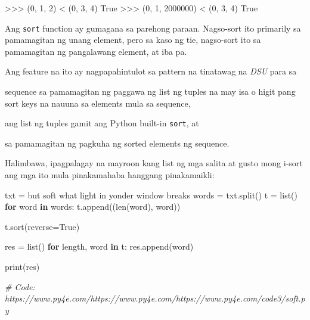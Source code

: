 \documentclass[10pt,]{book}
\newenvironment{Shaded}{}{}
\newcommand{\BuiltInTok}[1]{\textcolor[rgb]{0.00,0.50,0.00}{#1}}
\newcommand{\CommentTok}[1]{\textcolor[rgb]{0.38,0.63,0.69}{\textit{#1}}}
\newcommand{\ControlFlowTok}[1]{\textcolor[rgb]{0.00,0.44,0.13}{\textbf{#1}}}
\newcommand{\DecValTok}[1]{\textcolor[rgb]{0.25,0.63,0.44}{#1}}
\newcommand{\KeywordTok}[1]{\textcolor[rgb]{0.00,0.44,0.13}{\textbf{#1}}}
\newcommand{\NormalTok}[1]{#1}
\newcommand{\OperatorTok}[1]{\textcolor[rgb]{0.40,0.40,0.40}{#1}}
\newcommand{\StringTok}[1]{\textcolor[rgb]{0.25,0.44,0.63}{#1}}
\newcommand{\VariableTok}[1]{\textcolor[rgb]{0.10,0.09,0.49}{#1}}
\providecommand{\tightlist}{%
  \setlength{\itemsep}{0pt}\setlength{\parskip}{0pt}}
\begin{document}
\begin{Shaded}
\begin{Highlighting}[]
\OperatorTok{\textgreater{}\textgreater{}\textgreater{}}\NormalTok{ (}\DecValTok{0}\NormalTok{, }\DecValTok{1}\NormalTok{, }\DecValTok{2}\NormalTok{) }\OperatorTok{\textless{}}\NormalTok{ (}\DecValTok{0}\NormalTok{, }\DecValTok{3}\NormalTok{, }\DecValTok{4}\NormalTok{)}
\VariableTok{True}
\OperatorTok{\textgreater{}\textgreater{}\textgreater{}}\NormalTok{ (}\DecValTok{0}\NormalTok{, }\DecValTok{1}\NormalTok{, }\DecValTok{2000000}\NormalTok{) }\OperatorTok{\textless{}}\NormalTok{ (}\DecValTok{0}\NormalTok{, }\DecValTok{3}\NormalTok{, }\DecValTok{4}\NormalTok{)}
\VariableTok{True}
\end{Highlighting}
\end{Shaded}

Ang \texttt{sort} function ay gumagana sa parehong paraan. Nagso-sort
ito primarily sa pamamagitan ng unang element, pero sa kaso ng tie,
nagso-sort ito sa pamamagitan ng pangalawang element, at iba pa.

Ang feature na ito ay nagpapahintulot sa pattern na tinatawag na
\emph{DSU} para sa

\begin{description}
\tightlist
\item[Decorate]
sequence sa pamamagitan ng paggawa ng list ng tuples na may isa o higit
pang sort keys na nauuna sa elements mula sa sequence,
\item[Sort]
ang list ng tuples gamit ang Python built-in \texttt{sort}, at
\item[Undecorate]
sa pamamagitan ng pagkuha ng sorted elements ng sequence.
\end{description}

 
 

Halimbawa, ipagpalagay na mayroon kang list ng mga salita at gusto mong
i-sort ang mga ito mula pinakamahaba hanggang pinakamaikli:

\begin{Shaded}
\begin{Highlighting}[]
\NormalTok{txt }\OperatorTok{=} \StringTok{\textquotesingle{}but soft what light in yonder window breaks\textquotesingle{}}
\NormalTok{words }\OperatorTok{=}\NormalTok{ txt.split()}
\NormalTok{t }\OperatorTok{=} \BuiltInTok{list}\NormalTok{()}
\ControlFlowTok{for}\NormalTok{ word }\KeywordTok{in}\NormalTok{ words:}
\NormalTok{    t.append((}\BuiltInTok{len}\NormalTok{(word), word))}

\NormalTok{t.sort(reverse}\OperatorTok{=}\VariableTok{True}\NormalTok{)}

\NormalTok{res }\OperatorTok{=} \BuiltInTok{list}\NormalTok{()}
\ControlFlowTok{for}\NormalTok{ length, word }\KeywordTok{in}\NormalTok{ t:}
\NormalTok{    res.append(word)}

\BuiltInTok{print}\NormalTok{(res)}

\CommentTok{\# Code: https://www.py4e.com/https://www.py4e.com/https://www.py4e.com/code3/soft.py}
\end{Highlighting}
\end{Shaded}
\end{document}

